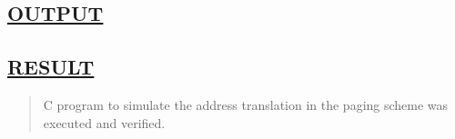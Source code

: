 \documentclass[a4paper, 12pt]{article}
\begin{document}
\newpage
\subsection*{\underline{OUTPUT}}

\begin{figure}[H] 
    \centering
\end{figure}


\subsection*{\underline{RESULT}}
\begin{quote}
C program to simulate the address translation in the paging scheme was executed and verified.
\end{quote}
\end{document}
